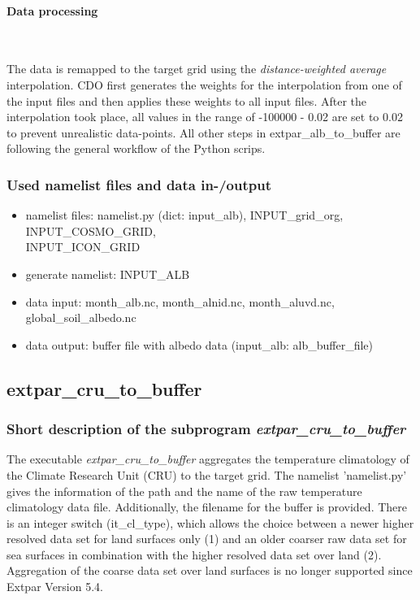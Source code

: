 \documentclass[a4paper,10pt,DIV14,BCOR1cm,titlepage,twoside]{scrartcl}
\begin{document}
\paragraph{Data processing} \ \par\medskip\noindent
The data is remapped to the target grid using the \textit{distance-weighted average} interpolation. CDO first generates the weights for the interpolation from one of the input files and then applies these weights to all input files. After the interpolation took place, all values in the range of -100000 - 0.02 are set to 0.02 to prevent unrealistic data-points. All other steps in extpar\_alb\_to\_buffer are following the general workflow of the Python scrips.\par\medskip\noindent

\subsubsection{Used namelist files and data in-/output}
\begin{itemize}
  \item namelist files: namelist.py (dict: input\_alb), INPUT\_grid\_org, INPUT\_COSMO\_GRID, \\
        INPUT\_ICON\_GRID
  \item generate namelist: INPUT\_ALB
  \item data input: month\_alb.nc, month\_alnid.nc, month\_aluvd.nc, global\_soil\_albedo.nc
  \item data output: buffer file with albedo data (input\_alb: alb\_buffer\_file)
\end{itemize}

\subsection{extpar\_cru\_to\_buffer}\label{extpar_cru_to_buffer}
\subsubsection{Short description of the subprogram \textit{extpar\_cru\_to\_buffer}}
The executable \textit{extpar\_cru\_to\_buffer} aggregates the temperature climatology of the Climate Research Unit (CRU) to the target grid. 
The namelist 'namelist.py' gives the information of the path and the name of the raw temperature climatology data file. Additionally, the filename for the buffer is provided. There is an integer switch (it\_cl\_type), which allows the choice between a newer higher resolved data set for land surfaces only (1) and an older coarser raw data set for sea surfaces in combination with the  higher resolved data set over land (2). Aggregation of the coarse data set over land surfaces is no longer supported since Extpar Version 5.4. \par\medskip\noindent
\end{document}
